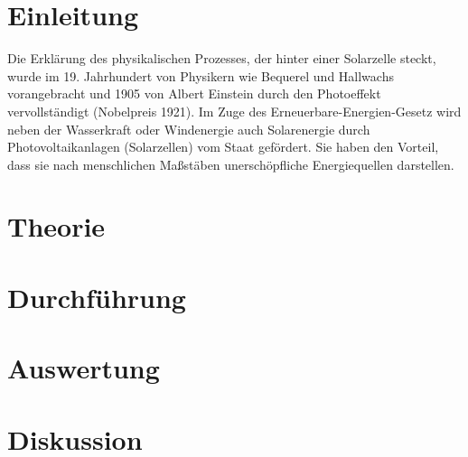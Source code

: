 \section{Einleitung}				%
Die Erklärung des physikalischen Prozesses, der hinter einer Solarzelle steckt,  wurde im 19. Jahrhundert von 
Physikern wie Bequerel und Hallwachs vorangebracht und 1905 von Albert Einstein durch den Photoeffekt vervollständigt (Nobelpreis 1921).
Im Zuge des Erneuerbare-Energien-Gesetz wird neben der Wasserkraft oder Windenergie auch Solarenergie durch Photovoltaikanlagen 
(Solarzellen) vom Staat  gefördert. Sie haben den Vorteil, dass sie nach menschlichen Maßstäben unerschöpfliche Energiequellen 
darstellen.



\section{Theorie}


\section{Durchführung}


\section{Auswertung}


\section{Diskussion}





